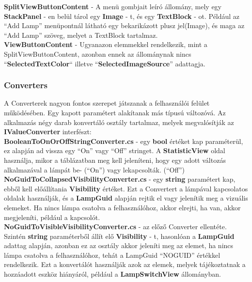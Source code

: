 \documentclass[a4paper,12pt]{report}
\begin{document}
    \textbf{SplitViewButtonContent} - A menü gombjait leíró állomány, mely egy \textbf{StackPanel} - en belül tárol egy \textbf{Image} - t,
    és egy \textbf{TextBlock} - ot. Például az ``Add Lamp'' menüpontnál látható egy bekarikázott plusz jel(Image), és maga az ``Add Lamp''
    szöveg, melyet a TextBlock tartalmaz.\\

    \textbf{ViewButtonContent} - Ugyanazon elemmekkel rendelkezik, mint a SplitViewButtonContent, azonban ennek az állománynak nincs
    ``\textbf{SelectedTextColor}`` illetve ``\textbf{SelectedImageSource}'' adattagja.

    \subsubsection{Converters}
    A Converterek nagyon fontos szerepet játszanak a felhasználói felület működésében. Egy kapott paramétert alakítanak más típusú
    változóvá. Az alkalmazás négy darab konvertáló osztály tartalmaz, melyek megvalósítják az \textbf{IValueConverter} interfészt:\\

    \textbf{BooleanToOnOrOffStringConverter.cs} - egy \textbf{bool} értéket kap paraméterül, ez alapján ad vissza egy ``On'' vagy
    ``Off'' stringet. A \textbf{StatisticView} oldal használja, mikor a táblázatban meg kell jeleníteni, hogy egy adott változás
    alkalmazával a lámpát be- (``On'') vagy lekapcsolták. (``Off'')\\

    \textbf{NoGuidToCollapsedVisibilityConverter.cs} - egy \textbf{string} paramétert kap, ebből kell előállítania \textbf{Visibility} értéket.
    Ezt a Convertert a lámpával kapcsolatos oldalak használják, és a \textbf{LampGuid} alapján rejtik el vagy jelenítik meg
    a vizuális elemeket. Ha nincs lámpa csatolva a felhasználóhoz, akkor elrejti, ha van, akkor megjeleníti, például a kapcsolót.\\

    \textbf{NoGuidToVisibleVisibilityConverter.cs} - az előző Converter ellentéte. Szintén \textbf{string} paraméterből állít elő
    \textbf{Visibility} - t, hasonlóan a \textbf{LampGuid} adattag alapján, azonban ez az osztály akkor jeleníti meg az elemet,
    ha nincs lámpa csatolva a felhasználóhoz, tehát a LampGuid ``NOGUID'' értékkel rendelkezik. Ezt a konvertálót használják azok az
    elemek, melyek tájékoztatnak a hozzáadott eszköz hiányáról, például a \textbf{LampSwitchView} állományban.\\
\end{document}
